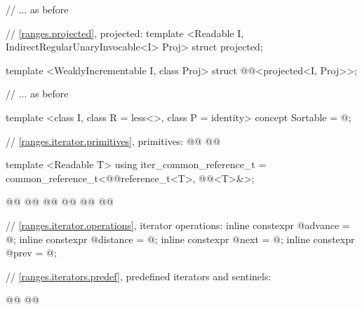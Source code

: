 \begin{codeblock}
{{    // ... as before

    // \ref{ranges.projected}, projected:
    template <Readable I, IndirectRegularUnaryInvocable<I> Proj>
    struct projected;

    template <WeaklyIncrementable I, class Proj>
    struct @@<projected<I, Proj>>;

    // ... as before

    template <class I, class R = less<>, class P = identity>
    concept Sortable = @\seebelow@;

    // \ref{ranges.iterator.primitives}, primitives:
    @@
    @@

    template <Readable T> using iter_common_reference_t
      = common_reference_t<@@reference_t<T>, @@<T>&>;

    @@
    @@
    @@
    @@
    @@
    @@

    // \ref{ranges.iterator.operations}, iterator operations:
    inline constexpr @\unspec@ advance = @\unspec@;
    inline constexpr @\unspec@ distance = @\unspec@;
    inline constexpr @\unspec@ next = @\unspec@;
    inline constexpr @\unspec@ prev = @\unspec@;

    // \ref{ranges.iterators.predef}, predefined iterators and sentinels:

    @@
    @@

}}
\end{codeblock}
